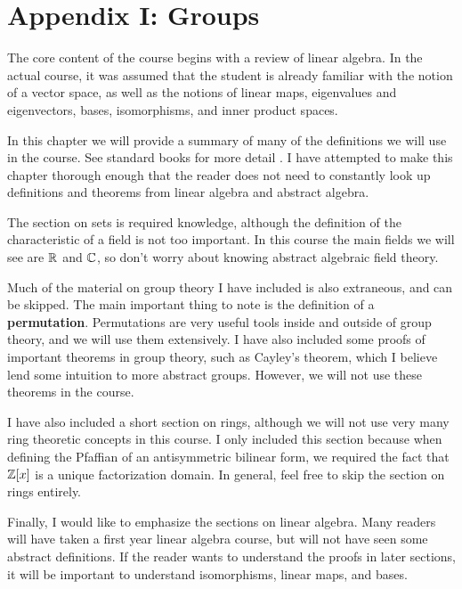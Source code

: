 

\section{Appendix I: Groups}
The core content of the course begins with a review of linear algebra. In the actual course, it was assumed that the student is already familiar with the notion of a vector space, as well as the notions of linear maps, eigenvalues and eigenvectors, bases, isomorphisms, and inner product spaces.

In this chapter we will provide a summary of many of the definitions we will use in the course. See standard books for more detail \cite{Aluffi2009-wb,Jacobson2009-pp,Dummit2003-rj,Roman2008-rh,Axler2015-in}. I have attempted to make this chapter thorough enough that the reader does not need to constantly look up definitions and theorems from linear algebra and abstract algebra.

The section on sets is required knowledge, although the definition of the characteristic of a field is not too important. In this course the main fields we will see are $\operatorname{\mathbb{R}}$ and $\operatorname{\mathbb{C}}$, so don't worry about knowing abstract algebraic field theory.

Much of the material on group theory I have included is also extraneous, and can be skipped. The main important thing to note is the definition of a \textbf{permutation}. Permutations are very useful tools inside and outside of group theory, and we will use them extensively. I have also included some proofs of important theorems in group theory, such as Cayley's theorem, which I believe lend some intuition to more abstract groups. However, we will not use these theorems in the course.

I have also included a short section on rings, although we will not use very many ring theoretic concepts in this course. I only included this section because when defining the Pfaffian of an antisymmetric bilinear form, we required the fact that $\operatorname{\mathbb{Z}}[x]$ is a unique factorization domain. In general, feel free to skip the section on rings entirely.

Finally, I would like to emphasize the sections on linear algebra. Many readers will have taken a first year linear algebra course, but will not have seen some abstract definitions. If the reader wants to understand the proofs in later sections, it will be important to understand isomorphisms, linear maps, and bases. 



